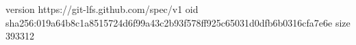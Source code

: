 version https://git-lfs.github.com/spec/v1
oid sha256:019a64b8c1a8515724d6f99a43c2b93f578ff925c65031d0dfb6b0316cfa7e6e
size 393312

